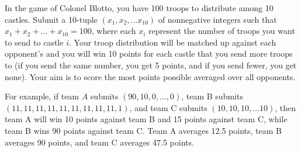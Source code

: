 In the game of Colonel Blotto, you have 100 troops to distribute among 10 castles. Submit a 10-tuple $(x_1, x_2, \dots x_{10})$ of nonnegative integers such that $x_1 + x_2 + \dots + x_{10} = 100$, where each $x_i$ represent the number of troops you want to send to castle $i$. Your troop distribution will be matched up against each opponent's and you will win 10 points for each castle that you send more troops to (if you send the same number, you get 5 points, and if you send fewer, you get none). Your aim is to score the most points possible averaged over all opponents. 

For example, if team $A$ submits $(90,10,0,\dots,0)$, team B submits $(11,11,11,11,11,11,11,11,11,1)$, and team C submits $(10,10,10,\dots 10)$, then team A will win 10 points against team B and 15 points against team C, while team B wins 90 points against team C. Team A averages 12.5 points, team B averages 90 points, and team C averages 47.5 points.